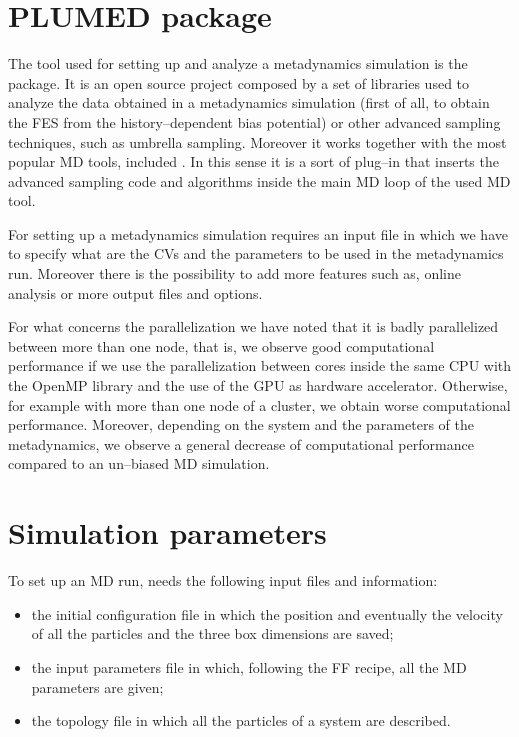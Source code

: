 \section{PLUMED package}
The tool used for setting up and analyze a metadynamics simulation is the \href{http://www.plumed.org}{\plumed{}} 
package. It is an open source project composed by a set of libraries used to analyze the data obtained in a 
metadynamics simulation (first of all, to obtain the \ac{FES} from the history--dependent bias potential) or 
other advanced sampling techniques, such as umbrella sampling. Moreover it works together with the most popular 
\ac{MD} tools, included \gromacs{}. In this sense it is a sort of plug--in that inserts the advanced sampling code 
and algorithms inside the main \ac{MD} loop of the used \ac{MD} tool.

For setting up a metadynamics simulation \plumed{} requires an input file in which we have to specify what are the 
\acp{CV} and the parameters to be used in the metadynamics run. Moreover there is the possibility to add more 
features such as, online analysis or more output files and options.

For what concerns the parallelization we have noted that it is badly parallelized between more than one node, 
that is, we observe good computational performance if we use the parallelization between cores inside the same 
CPU with the OpenMP library and the use of the GPU as hardware accelerator. Otherwise, for example with more than 
one node of a cluster, we obtain worse computational performance. Moreover, depending on the system and the 
parameters of the metadynamics, we observe a general decrease of computational performance compared to an 
un--biased \ac{MD} simulation.

\newpage
\section{Simulation parameters}
To set up an \ac{MD} run, \gromacs{} needs the following input files and information:
\begin{itemize}
	\item the initial configuration file in which the position and eventually the velocity of all the particles and the three box dimensions are saved;%
	\item the input parameters file in which, following the \ac{FF} recipe, all the \ac{MD} parameters are given;
	\item the topology file in which all the particles of a system are described.
\end{itemize}

